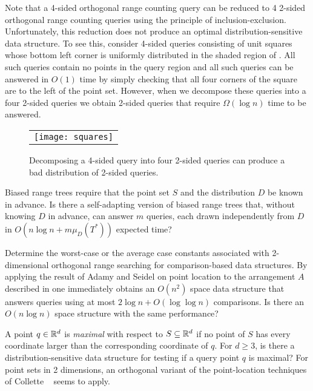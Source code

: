 \documentclass[charterfonts]{patmorin}
\begin{document}
Note that a 4-sided orthogonal range counting query can be reduced to
4 2-sided orthogonal range counting queries using the principle of
inclusion-exclusion.  Unfortunately, this reduction does not produce
an optimal distribution-sensitive data structure.  To see this,
consider 4-sided queries consisting of unit squares whose bottom left
corner is uniformly distributed in the shaded region of
.  All such queries contain no points in the query
region and all such queries can be answered in $O(1)$ time by simply
checking that all four corners of the square are to the left of the point
set.  However, when we decompose these queries into a four 2-sided
queries we obtain 2-sided queries that require $\Omega(\log n)$ time
to be answered.

\begin{figure}
  \begin{center}
    \begin{tabular}{c}
      \texttt{[image: squares]}
    \end{tabular}
  \end{center}
  \caption{Decomposing a 4-sided query into four 2-sided queries can
           produce a bad distribution of 2-sided queries.}
\end{figure}



\begin{op}
Biased range trees require that the point set $S$ and the
distribution $D$ be known in advance.  Is
there a self-adapting version of biased range trees that, without
knowing $D$ in advance, can answer $m$ queries, each drawn
independently from $D$ in $O(n\log n+ m\mu_D(T^*))$ expected time?
\end{op}

\begin{op}
Determine the worst-case or the average case constants associated with
2-dimensional orthogonal range searching for comparison-based data structures.
By applying the result of Adamy and Seidel \cite{as98} on point
location to the arrangement $A$ described in  one
immediately obtains an $O(n^2)$ space data structure that answers
queries using at most $2\log n + O(\log\log n)$ comparisons.  Is there
an $O(n\log n)$ space structure with the same performance?
\end{op}

\begin{op}
A point $q\in \mathbb{R}^d$ is \emph{maximal} with respect to $S\subseteq\mathbb{R}^d$
if no point of $S$ has every coordinate larger than the corresponding
coordinate of $q$. For $d\ge 3$,  is there a distribution-sensitive 
data structure for
testing if a query point $q$ is maximal?  For point sets in 2
dimensions, an orthogonal variant of the point-location techniques of Collette
\etal\ \cite{cdilm08} seems to apply. 
\end{op}
\end{document}
